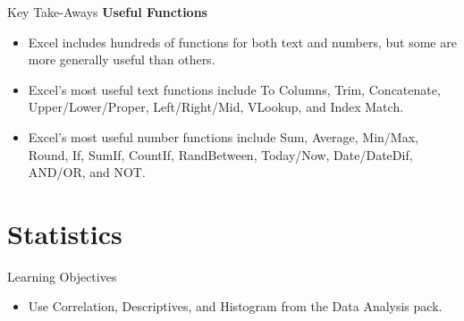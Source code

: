 %
%

\begin{center}
	\begin{tkwbox}{Key Take-Aways}
		\textbf{Useful Functions}
		\\
		\begin{itemize}
			\setlength{\itemsep}{0pt}
			\setlength{\parskip}{0pt}
			\setlength{\parsep}{0pt}
			
			\item Excel includes hundreds of functions for both text and numbers, but some are more generally useful than others.  
			\item Excel's most useful text functions include To Columns, Trim, Concatenate, Upper/Lower/Proper, Left/Right/Mid, VLookup, and Index Match.
			\item Excel's most useful number functions include Sum, Average, Min/Max, Round, If, SumIf, CountIf, RandBetween, Today/Now, Date/DateDif, AND/OR, and NOT.
			
		\end{itemize}
	\end{tkwbox}
\end{center}

\section{Statistics}

\begin{center}
	\begin{objbox}{Learning Objectives}
		\begin{itemize}
			\setlength{\itemsep}{0pt}
			\setlength{\parskip}{0pt}
			\setlength{\parsep}{0pt}
			
			\item Use Correlation, Descriptives, and Histogram from the Data Analysis pack.
			
		\end{itemize}
	\end{objbox}
\end{center}

